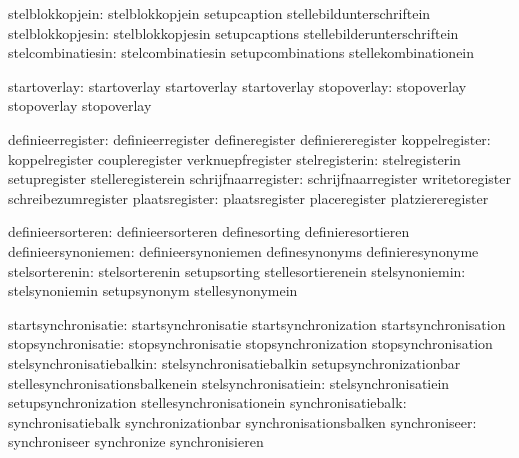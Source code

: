               stelblokkopjein:  stelblokkopjein              setupcaption
                                stellebildunterschriftein
             stelblokkopjesin:  stelblokkopjesin             setupcaptions
                                stellebilderunterschriftein
            stelcombinatiesin:  stelcombinatiesin            setupcombinations
                                stellekombinationein

                 startoverlay:  startoverlay                 startoverlay
                                startoverlay
                  stopoverlay:  stopoverlay                  stopoverlay
                                stopoverlay

            definieerregister:  definieerregister            defineregister
                                definiereregister
               koppelregister:  koppelregister               coupleregister
                                verknuepfregister
               stelregisterin:  stelregisterin               setupregister
                                stelleregisterein
          schrijfnaarregister:  schrijfnaarregister          writetoregister
                                schreibezumregister
               plaatsregister:  plaatsregister               placeregister
                                platziereregister

            definieersorteren:  definieersorteren            definesorting
                                definieresortieren
          definieersynoniemen:  definieersynoniemen          definesynonyms
                                definieresynonyme
               stelsorterenin:  stelsorterenin               setupsorting
                                stellesortierenein
               stelsynoniemin:  stelsynoniemin               setupsynonym
                                stellesynonymein

          startsynchronisatie:  startsynchronisatie          startsynchronization
                                startsynchronisation
           stopsynchronisatie:  stopsynchronisatie           stopsynchronization
                                stopsynchronisation
     stelsynchronisatiebalkin:  stelsynchronisatiebalkin     setupsynchronizationbar
                                stellesynchronisationsbalkenein
         stelsynchronisatiein:  stelsynchronisatiein         setupsynchronization
                                stellesynchronisationein
           synchronisatiebalk:  synchronisatiebalk           synchronizationbar
                                synchronisationsbalken
                synchroniseer:  synchroniseer                synchronize
                                synchronisieren

